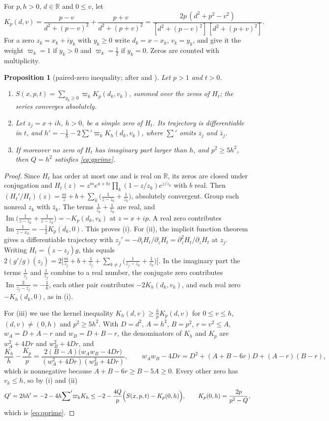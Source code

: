 \documentclass[11pt]{article}
\newtheorem{proposition}[theorem]{Proposition}
\theoremstyle{definition}
\theoremstyle{remark}
\newcommand{\R}{\mathbb R}
\newcommand{\im}{\operatorname{Im}}
\numberwithin{equation}{section}
\begin{document}
For $p,h>0$, $d\in\R$ and $0\le v$, let
\[
K_p(d,v)=\frac{p-v}{d^2+(p-v)^2}+\frac{p+v}{d^2+(p+v)^2}
=\frac{2p\,(d^2+p^2-v^2)}{[d^2+(p-v)^2]\,[d^2+(p+v)^2]}.
\]
For a zero $z_k=x_k+iy_k$ with $y_k\ge0$ write $d_k=x-x_k$, $v_k=y_k$,
and give it the weight $\varpi_k=1$ if $y_k>0$ and $\varpi_k=\frac12$ if
$y_k=0$. Zeros are counted with multiplicity.

\begin{proposition}[paired-zero inequality; after {\cite[Section~4]{hb}} and {\cite[Proposition~3.3]{p01}}]\label{prop:paired}
Let $p>1$ and $t>0$.
\begin{enumerate}
\item[(i)] $S(x,p,t)=\sum_{y_k\ge0}\varpi_kK_p(d_k,v_k)$, summed over the
zeros of $H_t$; the series converges absolutely.
\item[(ii)] Let $z_j=x+ih$, $h>0$, be a simple zero of $H_t$. Its
trajectory is differentiable in $t$, and
$h'=-\frac1h-2\sum'\varpi_kK_h(d_k,v_k)$, where $\sum'$ omits $z_j$ and
$\bar z_j$.
\item[(iii)] If moreover no zero of $H_t$ has imaginary part larger than
$h$, and $p^2\ge5h^2$, then $Q=h^2$ satisfies \eqref{eq:qprime}.
\end{enumerate}
\end{proposition}

\begin{proof}
Since $H_t$ has order at most one and is real on $\R$, its zeros are
closed under conjugation and
$H_t(z)=z^me^{a+bz}\prod_k(1-z/z_k)e^{z/z_k}$ with $b$ real. Then
$(H_t'/H_t)(z)=\frac mz+b+\sum_k\bigl(\frac1{z-z_k}+\frac1{z_k}\bigr)$,
absolutely convergent. Group each nonreal $z_k$ with $\bar z_k$. The
terms $\frac1{z_k}+\frac1{\bar z_k}$ are real, and
$\im\bigl(\frac1{z-z_k}+\frac1{z-\bar z_k}\bigr)=-K_p(d_k,v_k)$ at
$z=x+ip$. A real zero contributes $\im\frac1{z-x_k}=-\frac12K_p(d_k,0)$.
This proves (i). For (ii), the implicit function theorem gives a
differentiable trajectory with
$z_j'=-\partial_tH_t/\partial_zH_t=\partial_z^2H_t/\partial_zH_t$ at $z_j$.
Writing $H_t=(z-z_j)g$, this equals
$2(g'/g)(z_j)=2\bigl[\frac m{z_j}+b+\frac1{z_j}+\sum_{k\ne j}\bigl(\frac1{z_j-z_k}+\frac1{z_k}\bigr)\bigr]$.
In the imaginary part the terms $\frac1{z_j}$ and $\frac1{\bar z_j}$
combine to a real number, the conjugate zero contributes
$\im\frac2{z_j-\bar z_j}=-\frac1h$, each other pair contributes
$-2K_h(d_k,v_k)$, and each real zero $-K_h(d_k,0)$, as in (i).

For (iii) we use the kernel inequality $K_h(d,v)\ge\frac hpK_p(d,v)$
for $0\le v\le h$, $(d,v)\ne(0,h)$ and $p^2\ge5h^2$. With $D=d^2$,
$A=h^2$, $B=p^2$, $r=v^2\le A$, $w_A=D+A-r$ and $w_B=D+B-r$, the
denominators of $K_h$ and $K_p$ are $w_A^2+4Dr$ and $w_B^2+4Dr$, and
\[
\frac{K_h}h-\frac{K_p}p=\frac{2(B-A)\bigl(w_Aw_B-4Dr\bigr)}{(w_A^2+4Dr)(w_B^2+4Dr)},\qquad
w_Aw_B-4Dr=D^2+(A+B-6r)D+(A-r)(B-r),
\]
which is nonnegative because $A+B-6r\ge B-5A\ge0$. Every other zero has
$v_k\le h$, so by (i) and (ii)
\[
Q'=2hh'=-2-4h{\sum}'\varpi_kK_h\le-2-\frac{4Q}p\Bigl(S(x,p,t)-K_p(0,h)\Bigr),
\qquad K_p(0,h)=\frac{2p}{p^2-Q},
\]
which is \eqref{eq:qprime}.
\end{proof}
\end{document}
